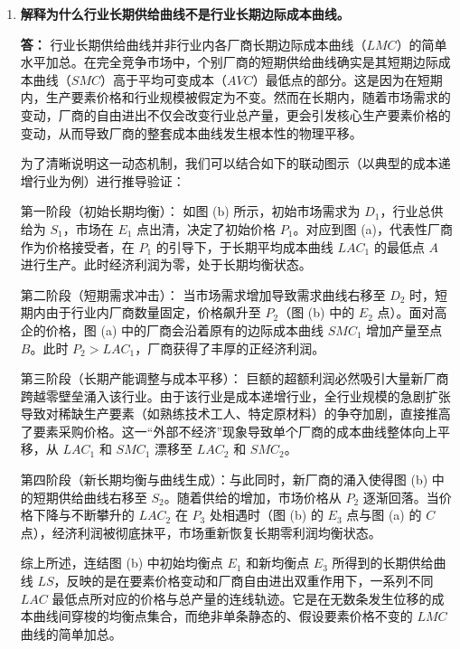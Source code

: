 \begin{enumerate}[label=\textbf{\arabic*.}, leftmargin=*]
\begin{center}
		\end{center}
		\newpage
		
		\item \textbf{解释为什么行业长期供给曲线不是行业长期边际成本曲线。}
		
		\textbf{答：}
		行业长期供给曲线并非行业内各厂商长期边际成本曲线（$LMC$）的简单水平加总。在完全竞争市场中，个别厂商的短期供给曲线确实是其短期边际成本曲线（$SMC$）高于平均可变成本（$AVC$）最低点的部分。这是因为在短期内，生产要素价格和行业规模被假定为不变。然而在长期内，随着市场需求的变动，厂商的自由进出不仅会改变行业总产量，更会引发核心生产要素价格的变动，从而导致厂商的整套成本曲线发生根本性的物理平移。
		
		为了清晰说明这一动态机制，我们可以结合如下的联动图示（以典型的成本递增行业为例）进行推导验证：
		
		第一阶段（初始长期均衡）： 如图 (b) 所示，初始市场需求为 $D_1$，行业总供给为 $S_1$，市场在 $E_1$ 点出清，决定了初始价格 $P_1$。对应到图 (a)，代表性厂商作为价格接受者，在 $P_1$ 的引导下，于长期平均成本曲线 $LAC_1$ 的最低点 $A$ 进行生产。此时经济利润为零，处于长期均衡状态。
		
		第二阶段（短期需求冲击）： 当市场需求增加导致需求曲线右移至 $D_2$ 时，短期内由于行业内厂商数量固定，价格飙升至 $P_2$（图 (b) 中的 $E_2$ 点）。面对高企的价格，图 (a) 中的厂商会沿着原有的边际成本曲线 $SMC_1$ 增加产量至点 $B$。此时 $P_2 > LAC_1$，厂商获得了丰厚的正经济利润。
		
		第三阶段（长期产能调整与成本平移）： 巨额的超额利润必然吸引大量新厂商跨越零壁垒涌入该行业。由于该行业是成本递增行业，全行业规模的急剧扩张导致对稀缺生产要素（如熟练技术工人、特定原材料）的争夺加剧，直接推高了要素采购价格。这一“外部不经济”现象导致单个厂商的成本曲线整体向上平移，从 $LAC_1$ 和 $SMC_1$ 漂移至 $LAC_2$ 和 $SMC_2$。
		
		第四阶段（新长期均衡与曲线生成）：与此同时，新厂商的涌入使得图 (b) 中的短期供给曲线右移至 $S_2$。随着供给的增加，市场价格从 $P_2$ 逐渐回落。当价格下降与不断攀升的 $LAC_2$ 在 $P_3$ 处相遇时（图 (b) 的 $E_3$ 点与图 (a) 的 $C$ 点），经济利润被彻底抹平，市场重新恢复长期零利润均衡状态。
		
		综上所述，连结图 (b) 中初始均衡点 $E_1$ 和新均衡点 $E_3$ 所得到的长期供给曲线 $LS$，反映的是在要素价格变动和厂商自由进出双重作用下，一系列不同 $LAC$ 最低点所对应的价格与总产量的连线轨迹。它是在无数条发生位移的成本曲线间穿梭的均衡点集合，而绝非单条静态的、假设要素价格不变的 $LMC$ 曲线的简单加总。
		

\end{enumerate}
